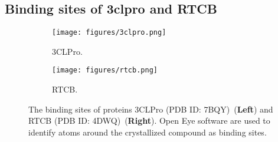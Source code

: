 \subsection{Binding sites of 3clpro and RTCB}
\begin{figure*}[ht!]

    \begin{subfigure}{.5\textwidth}
        \centering
        \texttt{[image: figures/3clpro.png]}
        \caption{3CLPro.}\label{fig:exp:combine_expertise}
    \end{subfigure}\hfil
    \begin{subfigure}{.5\textwidth}
        \centering
        \texttt{[image: figures/rtcb.png]}
        \caption{RTCB.}\label{fig:exp:sample}
    \end{subfigure}\hfil
    \caption{The binding sites of proteins 3CLPro (PDB ID: 7BQY)~(\textbf{Left}) and RTCB (PDB ID: 4DWQ)~(\textbf{Right}). {Open Eye software are used to identify atoms around the crystallized compound as binding sites.}     
    }
\end{figure*}













